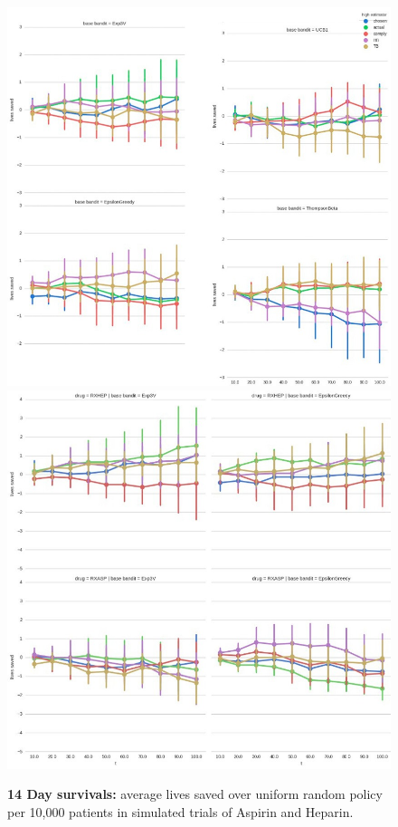 \begin{figure}
\begin{center}
\includegraphics[width=1\columnwidth]{bandit/figs/fig1a.jpeg}
\includegraphics[width=1\columnwidth]{bandit/figs/fig1b.jpeg}
\caption{\textbf{14 Day survivals:} average lives saved over uniform random policy per 10,000 patients in simulated trials of Aspirin and Heparin.}
\label{fig1}
\end{center}
\end{figure} 

